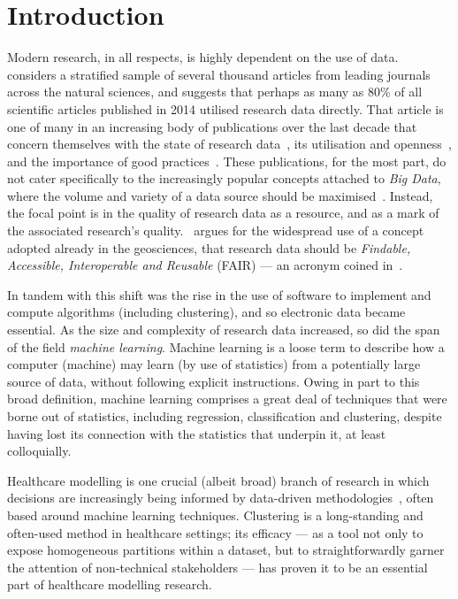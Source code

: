 \section{Introduction}\label{sec:intro}

Modern research, in all respects, is highly dependent on the use of
data.~\cite{Womack2015} considers a stratified sample of several thousand
articles from leading journals across the natural sciences, and suggests that
perhaps as many as 80\% of all scientific articles published in 2014 utilised
research data directly. That article is one of many in an increasing body of
publications over the last decade that concern themselves with the state of
research data~\cite{Higman2019}, its utilisation and
openness~\cite{Aslam2017,Zuiderwijk2020}, and the importance of good
practices~\cite{Colavizza2020,Corti2019}. These publications, for the most part,
do not cater specifically to the increasingly popular concepts attached to
\emph{Big Data}, where the volume and variety of a data source should be
maximised~\cite{Batisti2019}. Instead, the focal point is in the quality of
research data as a resource, and as a mark of the associated research's
quality.~\cite{Stall2019} argues for the widespread use of a concept adopted
already in the geosciences, that research data should be \emph{Findable,
Accessible, Interoperable and Reusable} (FAIR) --- an acronym coined
in~\cite{Wilkinson2016}.

In tandem with this shift was the rise in the use of software to implement and
compute algorithms (including clustering), and so electronic data became
essential. As the size and complexity of research data increased, so did the
span of the field \emph{machine learning}. Machine learning is a loose term to
describe how a computer (machine) may learn (by use of statistics) from a
potentially large source of data, without following explicit instructions. Owing
in part to this broad definition, machine learning comprises a great deal of
techniques that were borne out of statistics, including regression,
classification and clustering, despite having lost its connection with the
statistics that underpin it, at least colloquially.

Healthcare modelling is one crucial (albeit broad) branch of research in which
decisions are increasingly being informed by data-driven
methodologies~\cite{Alexander2018,Belle2015,RiosZertuche2020}, often based
around machine learning techniques. Clustering is a long-standing and often-used
method in healthcare settings; its efficacy --- as a tool not only to expose
homogeneous partitions within a dataset, but to straightforwardly garner the
attention of non-technical stakeholders --- has proven it to be an essential
part of healthcare modelling research.


